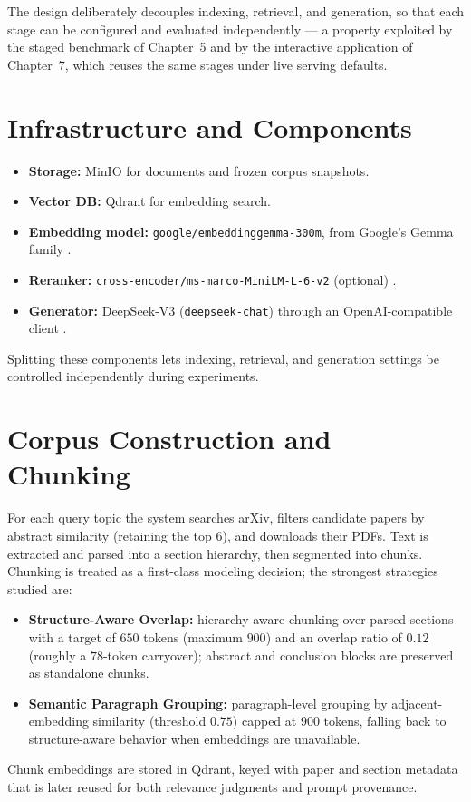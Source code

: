 \documentclass[12pt,a4paper,titlepage,oneside]{book}
\begin{document}
The design deliberately decouples indexing, retrieval, and generation, so that each stage can be configured and evaluated independently — a property exploited by the staged benchmark of Chapter~5 and by the interactive application of Chapter~7, which reuses the same stages under live serving defaults.

\section{Infrastructure and Components}
\begin{itemize}
    \item \textbf{Storage:} MinIO for documents and frozen corpus snapshots.
    \item \textbf{Vector DB:} Qdrant for embedding search.
    \item \textbf{Embedding model:} \texttt{google/embeddinggemma-300m}, from Google's Gemma family \cite{gemmateam2024gemma}.
    \item \textbf{Reranker:} \texttt{cross-encoder/ms-marco-MiniLM-L-6-v2} (optional) \cite{nogueira2019bert}.
    \item \textbf{Generator:} DeepSeek-V3 (\texttt{deepseek-chat}) through an OpenAI-compatible client \cite{deepseek2024v3}.
\end{itemize}
Splitting these components lets indexing, retrieval, and generation settings be controlled independently during experiments.

\section{Corpus Construction and Chunking}
For each query topic the system searches arXiv, filters candidate papers by abstract similarity (retaining the top $6$), and downloads their PDFs. Text is extracted and parsed into a section hierarchy, then segmented into chunks. Chunking is treated as a first-class modeling decision; the strongest strategies studied are:
\begin{itemize}
    \item \textbf{Structure-Aware Overlap:} hierarchy-aware chunking over parsed sections with a target of $650$ tokens (maximum $900$) and an overlap ratio of $0.12$ (roughly a $78$-token carryover); abstract and conclusion blocks are preserved as standalone chunks.
    \item \textbf{Semantic Paragraph Grouping:} paragraph-level grouping by adjacent-embedding similarity (threshold $0.75$) capped at $900$ tokens, falling back to structure-aware behavior when embeddings are unavailable.
\end{itemize}
Chunk embeddings are stored in Qdrant, keyed with paper and section metadata that is later reused for both relevance judgments and prompt provenance.
\end{document}
